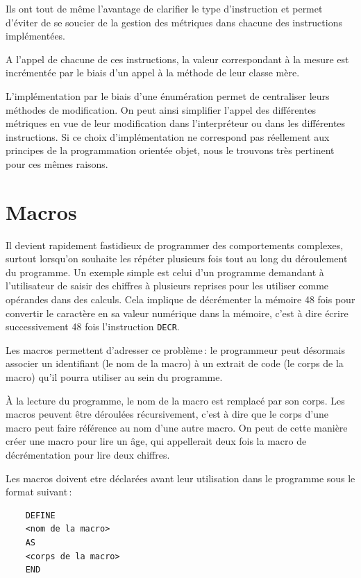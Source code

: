 \documentclass{article}
\begin{document}
    Ils ont tout de même l'avantage de clarifier le type d'instruction et permet d'éviter de se soucier de la gestion des métriques dans chacune des instructions implémentées.

    A l'appel de chacune de ces instructions, la valeur correspondant à la mesure est incrémentée par le biais d'un appel à la méthode de leur classe mère.


    L'implémentation par le biais d'une énumération permet de centraliser leurs méthodes de modification. On peut ainsi simplifier l'appel des différentes métriques en vue de leur modification dans l’interpréteur ou dans les différentes instructions. Si ce choix d'implémentation ne correspond pas réellement aux principes de la programmation orientée objet, nous le trouvons très pertinent pour ces mêmes raisons.



\section{Macros}

    Il devient rapidement fastidieux de programmer des comportements complexes, surtout lorsqu'on souhaite les répéter plusieurs fois tout au long du déroulement du programme. Un exemple simple est celui d'un programme demandant à l'utilisateur de saisir des chiffres à plusieurs reprises pour les utiliser comme opérandes dans des calculs. Cela implique de décrémenter la mémoire 48 fois pour convertir le caractère en sa valeur numérique dans la mémoire, c'est à dire écrire successivement 48 fois l'instruction \texttt{DECR}.

    Les macros permettent d'adresser ce problème : le programmeur peut désormais associer un identifiant (le nom de la macro) à un extrait de code (le corps de la macro) qu'il pourra utiliser au sein du programme.

    À la lecture du programme, le nom de la macro est remplacé par son corps.
Les macros peuvent être déroulées récursivement, c'est à dire que le corps d'une macro peut faire référence au nom d'une autre macro.
On peut de cette manière créer une macro pour lire un âge, qui appellerait deux fois la macro de décrémentation pour lire deux chiffres.


        Les macros doivent etre déclarées avant leur utilisation dans le programme sous le format suivant :

\begin{verbatim}
    DEFINE
    <nom de la macro>
    AS
    <corps de la macro>
    END
\end{verbatim}
\end{document}
